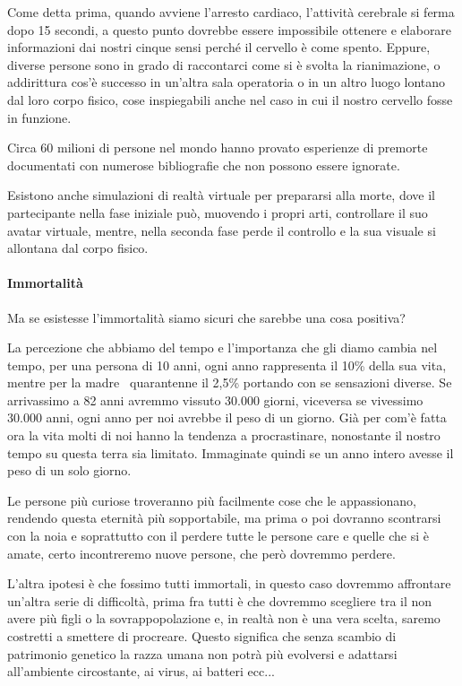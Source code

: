 \documentclass[12pt]{book} %
\begin{document}
Come detta prima, quando avviene l'arresto cardiaco, l'attività cerebrale si ferma dopo 15 secondi, a questo punto
dovrebbe essere impossibile ottenere e elaborare informazioni dai nostri cinque sensi perché il cervello è come spento.
Eppure, diverse persone sono in grado di raccontarci come si è svolta la rianimazione, o addirittura cos'è successo in
un'altra sala operatoria o in un altro luogo lontano dal loro corpo fisico, cose inspiegabili anche nel caso in cui il
nostro cervello fosse in funzione.

Circa 60 milioni di persone nel mondo hanno provato esperienze di premorte documentati con numerose bibliografie che non
possono essere
ignorate.

Esistono anche simulazioni di realtà virtuale per prepararsi alla morte, dove il partecipante nella fase iniziale può,
muovendo i propri arti, controllare il suo avatar virtuale, mentre, nella seconda fase perde il controllo e la sua
visuale si allontana dal corpo fisico.

\paragraph{Immortalità}
Ma se esistesse l'immortalità siamo sicuri che sarebbe una cosa positiva?

La percezione che abbiamo del tempo e l'importanza che gli diamo cambia nel tempo, per una persona
di 10 anni, ogni anno rappresenta il 10\% della sua vita, mentre per la madre \ quarantenne il 2,5\% portando con se
sensazioni diverse. Se arrivassimo a 82 anni avremmo vissuto 30.000 giorni, viceversa se vivessimo 30.000 anni, ogni
anno per noi avrebbe il peso di un giorno. Già per com'è fatta ora la vita molti di noi hanno la
tendenza a procrastinare, nonostante il nostro tempo su questa terra sia limitato. Immaginate quindi se un anno intero
avesse il peso di un solo giorno.

Le persone più curiose troveranno più facilmente cose che le appassionano, rendendo questa eternità più sopportabile, ma
prima o poi dovranno scontrarsi con la noia e soprattutto con il perdere tutte le persone care e quelle che si è amate,
certo incontreremo nuove persone, che però dovremmo perdere.

L'altra ipotesi è che fossimo tutti immortali, in questo caso dovremmo affrontare
un'altra serie di difficoltà, prima fra tutti è che dovremmo scegliere tra il non avere più figli
o la sovrappopolazione e, in realtà non è una vera scelta, saremo costretti a smettere di procreare. Questo significa
che senza scambio di patrimonio genetico la razza umana non potrà più evolversi e adattarsi
all'ambiente circostante, ai virus, ai batteri ecc...
\end{document}
